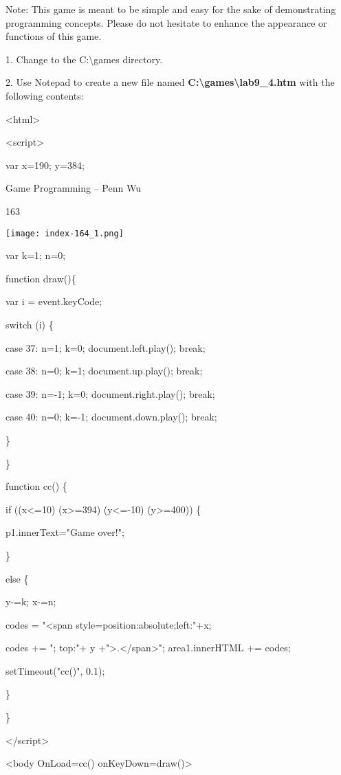 \documentclass[
]{article}
\begin{document}
\textbf{}

Note: This game is meant to be simple and easy for the sake of
demonstrating programming concepts. Please do not hesitate to enhance
the appearance or functions of this game.

1. Change to the C:\textbackslash games directory.

2. Use Notepad to create a new file named
\textbf{C:\textbackslash games\textbackslash lab9\_4.htm} with the
following contents:

\textless html\textgreater{}

\textless script\textgreater{}

var x=190; y=384;

Game Programming -- Penn Wu

163

\protect\hypertarget{index_split_010.htmlux5cux23p164}{}{}\texttt{[image: index-164\_1.png]}

var k=1; n=0;

function draw()\{

var i = event.keyCode;

switch (i) \{

case 37: n=1; k=0; document.left.play(); break;

case 38: n=0; k=1; document.up.play(); break;

case 39: n=-1; k=0; document.right.play(); break;

case 40: n=0; k=-1; document.down.play(); break;

\}

\}

function cc() \{

if ((x\textless=10) \textbar\textbar{} (x\textgreater=394)
\textbar\textbar{} (y\textless=-10) \textbar\textbar{}
(y\textgreater=400)) \{

p1.innerText="Game over!";

\}

else \{

y-=k; x-=n;

codes = "\textless span
style=\textquotesingle position:absolute;left:"+x;

codes += "; top:"+ y
+"\textquotesingle\textgreater.\textless/span\textgreater";
area1.innerHTML += codes;

setTimeout("cc()", 0.1);

\}

\}

\textless/script\textgreater{}

\textless body OnLoad=cc() onKeyDown=draw()\textgreater{}
\end{document}
